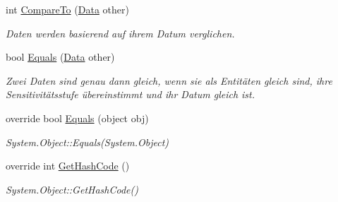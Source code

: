 \begin{CompactItemize}
\item 
int \hyperlink{classmy_m_d_1_1_model_1_1_data_model_1_1_data_4f2ddc0c8daaf94fefc04ccaff963d0f}{Compare\-To} (\hyperlink{classmy_m_d_1_1_model_1_1_data_model_1_1_data}{Data} other)
\begin{CompactList}\small\item\em Daten werden basierend auf ihrem Datum verglichen. \item\end{CompactList}\item 
bool \hyperlink{classmy_m_d_1_1_model_1_1_data_model_1_1_data_84b8ad0a281b10efd1ac00b24c3f4f2a}{Equals} (\hyperlink{classmy_m_d_1_1_model_1_1_data_model_1_1_data}{Data} other)
\begin{CompactList}\small\item\em Zwei Daten sind genau dann gleich, wenn sie als Entit\"{a}ten gleich sind, ihre Sensitivit\"{a}tsstufe \"{u}bereinstimmt und ihr Datum gleich ist. \item\end{CompactList}\item 
\hypertarget{classmy_m_d_1_1_model_1_1_data_model_1_1_data_b93f11cf5ba054f230a537cff58bd1c9}{
override bool \hyperlink{classmy_m_d_1_1_model_1_1_data_model_1_1_data_b93f11cf5ba054f230a537cff58bd1c9}{Equals} (object obj)}
\label{db/dac/classmy_m_d_1_1_model_1_1_data_model_1_1_data_b93f11cf5ba054f230a537cff58bd1c9}

\begin{CompactList}\small\item\em System.Object::Equals(System.Object) \item\end{CompactList}\item 
\hypertarget{classmy_m_d_1_1_model_1_1_data_model_1_1_data_871aff832c00675bb79db4294f382e58}{
override int \hyperlink{classmy_m_d_1_1_model_1_1_data_model_1_1_data_871aff832c00675bb79db4294f382e58}{Get\-Hash\-Code} ()}
\label{db/dac/classmy_m_d_1_1_model_1_1_data_model_1_1_data_871aff832c00675bb79db4294f382e58}

\begin{CompactList}\small\item\em System.Object::Get\-Hash\-Code() \item\end{CompactList}\end{CompactItemize}
